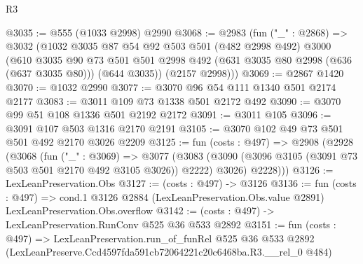 \begin{lexlean}{R3}
\begin{coremodule}
@3035 := @555 (@1033 @2998) @2990
@3068 := @2983
    (fun ("_" : @2868) =>
    @3032
      (@1032
        @3035
        @87
        @54
        @92
        @503
        @501
        (@482 @2998 @492)
        @3000
        (@610
          @3035
          @90
          @73
          @501
          @501
          @2998
          @492
          (@631 @3035 @80 @2998 (@636 (@637 @3035 @80)))
          (@644 @3035))
        (@2157 @2998)))
@3069 := @2867 @1420
@3070 := @1032 @2990
@3077 := @3070 @96 @54 @111 @1340 @501 @2174 @2177
@3083 := @3011 @109 @73 @1338 @501 @2172 @492
@3090 := @3070 @99 @51 @108 @1336 @501 @2192 @2172
@3091 := @3011 @105
@3096 := @3091 @107 @503 @1316 @2170 @2191
@3105 := @3070 @102 @49 @73 @501 @501 @492 @2170 @3026 @2209
@3125 := fun (costs : @497) =>
  @2908
    (@2928
      (@3068
        (fun ("_" : @3069) =>
        @3077
          (@3083 (@3090 (@3096 @3105 (@3091 @73 @503 @501 @2170 @492 @3105 @3026)) @2222) @3026)
          @2228)))
@3126 := LexLeanPreservation.Obs
@3127 := (costs : @497) -> @3126
@3136 := fun (costs : @497) =>
  cond.{1} @3126 @2884 (LexLeanPreservation.Obs.value @2891) LexLeanPreservation.Obs.overflow
@3142 := (costs : @497) -> LexLeanPreservation.RunConv @525 @36 @533 @2892
@3151 := fun (costs : @497) =>
  LexLeanPreservation.run_of_funRel
    @525
    @36
    @533
    @2892
    (LexLeanPreserve.Ccd4597fda591cb72064221c20c6468ba.R3.__rel_0 @484)
\end{coremodule}
\end{lexlean}
